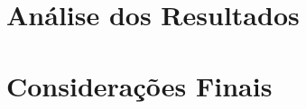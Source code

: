 \documentclass[12pt]{article}
\begin{document}


\section{Análise dos Resultados}

\section{Considerações Finais}



\end{document}
